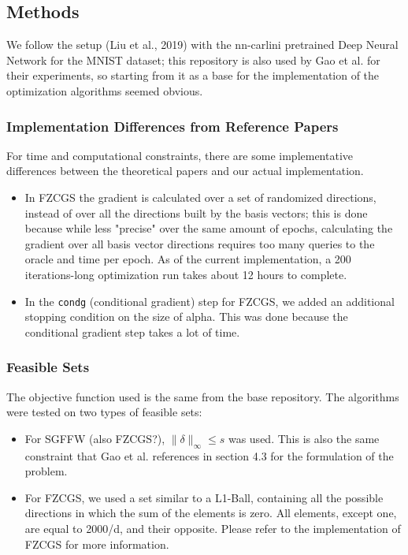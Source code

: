 \documentclass[10pt,twocolumn,letterpaper]{article}
\begin{document}
\subsection{Methods}

We follow the setup (Liu et al., 2019) with the nn-carlini pretrained Deep Neural Network for
the MNIST dataset; this repository is also used by Gao et al. for their experiments, so starting
from it as a base for the implementation of the optimization algorithms seemed obvious.

\subsubsection{Implementation Differences from Reference Papers}

For time and computational constraints, there are some implementative differences 
between the theoretical papers and our actual implementation.

\begin{itemize}
   \item In FZCGS the gradient is calculated over a set of 
   randomized directions, instead of over all 
   the directions built by the basis vectors; this is done because 
   while less "precise" over the same amount of epochs, 
   calculating the gradient over all basis vector directions 
   requires too many queries to the oracle and time per epoch.
   As of the current implementation, a 200 iterations-long 
   optimization run takes about 12 hours to complete.

   \item In the \texttt{condg} (conditional gradient) step for FZCGS,
   we added an additional stopping condition on the size of alpha.
   This was done because the conditional gradient step takes a lot of time.
\end{itemize}

\subsubsection{Feasible Sets}

The objective function used is the same from the base repository.
The algorithms were tested on two types of feasible sets:

\begin{itemize}
   \item For SGFFW (also FZCGS?), $\|\delta\|_{\infty} \leq s$ was used. This is 
   also the same constraint that Gao et al. references in section 4.3 for the formulation
   of the problem.
   \item For FZCGS, we used a set similar to a L1-Ball,  containing
   all the possible directions in which the sum of the elements is zero. All elements, except
   one, are equal to 2000/d, and their opposite. Please refer to the implementation of FZCGS for more information. 
\end{itemize}
\end{document}
